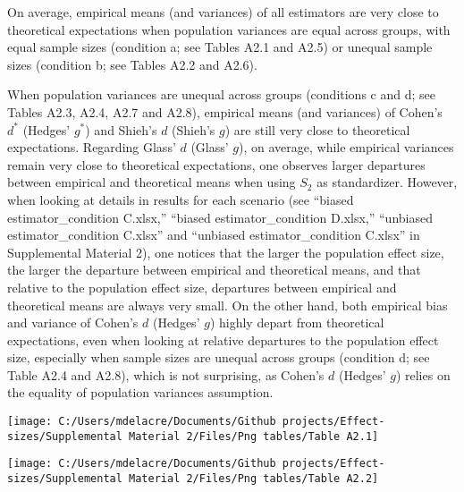\documentclass[
  english,
  man,mask]{apa6}
\begin{document}
On average, empirical means (and variances) of all estimators are very close to theoretical expectations when population variances are equal across groups, with equal sample sizes (condition a; see Tables A2.1 and A2.5) or unequal sample sizes (condition b; see Tables A2.2 and A2.6).

When population variances are unequal across groups (conditions c and d; see Tables A2.3, A2.4, A2.7 and A2.8), empirical means (and variances) of Cohen's \(d^*\) (Hedges' \(g^*\)) and Shieh's \(d\) (Shieh's \(g\)) are still very close to theoretical expectations. Regarding Glass' \(d\) (Glass' \(g\)), on average, while empirical variances remain very close to theoretical expectations, one observes larger departures between empirical and theoretical means when using \(S_2\) as standardizer. However, when looking at details in results for each scenario (see ``biased estimator\_condition C.xlsx,'' ``biased estimator\_condition D.xlsx,'' ``unbiased estimator\_condition C.xlsx'' and ``unbiased estimator\_condition C.xlsx'' in Supplemental Material 2), one notices that the larger the population effect size, the larger the departure between empirical and theoretical means, and that relative to the population effect size, departures between empirical and theoretical means are always very small. On the other hand, both empirical bias and variance of Cohen's \(d\) (Hedges' \(g\)) highly depart from theoretical expectations, even when looking at relative departures to the population effect size, especially when sample sizes are unequal across groups (condition d; see Table A2.4 and A2.8), which is not surprising, as Cohen's \(d\) (Hedges' \(g\)) relies on the equality of population variances assumption.

\begin{sidewaysfigure}

{\centering \texttt{[image: C:/Users/mdelacre/Documents/Github projects/Effect-sizes/Supplemental Material 2/Files/Png tables/Table A2.1]} 

}

\end{sidewaysfigure}

\begin{sidewaysfigure}

{\centering \texttt{[image: C:/Users/mdelacre/Documents/Github projects/Effect-sizes/Supplemental Material 2/Files/Png tables/Table A2.2]} 

}

\end{sidewaysfigure}
\end{document}
